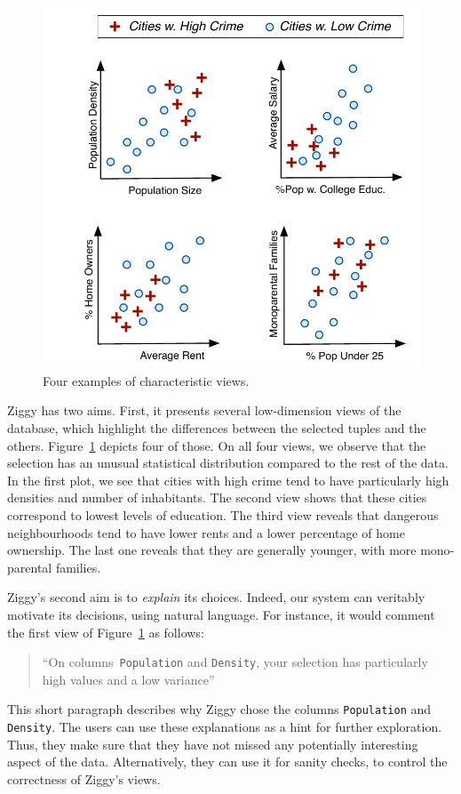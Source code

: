 \begin{figure}[t!]
    \centering
    \includegraphics[width=.9\columnwidth]{Images/CharacViews}
    \caption{Four examples of characteristic views.}
    \label{fig:characteristic-views}
\end{figure}

Ziggy has two aims. First, it presents several low-dimension views of the
database, which highlight the differences between the selected tuples and the
others.  Figure~\ref{fig:characteristic-views} depicts four of those. On all
four views, we observe that the selection has an unusual statistical
distribution compared to the rest of the data. In the first plot, we see that
cities with high crime tend to have particularly high densities and number of
inhabitants. The second view shows that these cities correspond to lowest
levels of education.  The third view reveals that dangerous neighbourhoods tend
to have lower rents and a lower percentage of home ownership. The last one
reveals that they are generally younger, with more mono-parental families.


Ziggy's second aim is to \emph{explain} its choices. Indeed, our system can
veritably motivate its decisions, using natural language. For instance, it
would comment the first view of Figure~\ref{fig:characteristic-views} as
follows:
\begin{quotation}
    ``On columns~\texttt{Population} and \texttt{Density}, your selection has
    particularly high values and a low variance''
\end{quotation} 
This short paragraph describes why Ziggy chose the columns \texttt{Population}
and \texttt{Density}. The users can use these explanations as a hint for further
exploration. Thus, they make sure that they have not missed any potentially
interesting aspect of the data. Alternatively, they can use it for sanity
checks, to control the correctness of Ziggy's views.

